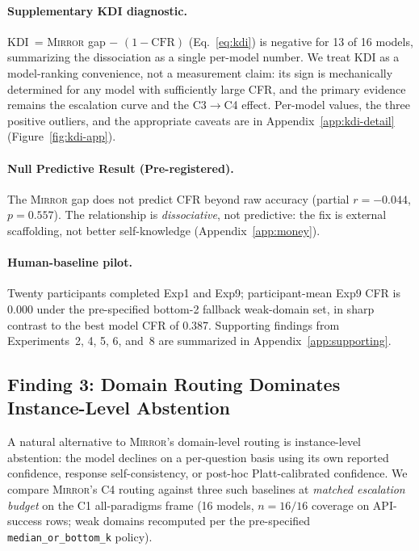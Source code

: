 \documentclass[10pt]{article}
\newcommand{\mirror}{\textsc{Mirror}}
\newcommand{\KDI}{KDI}
\newcommand{\CFR}{CFR}
\begin{document}
\paragraph{Supplementary \KDI{} diagnostic.}
\KDI{}~= \mirror{} gap $-$ $(1 - \text{CFR})$ (Eq.~\ref{eq:kdi}) is negative for 13 of 16 models, summarizing the dissociation as a single per-model number. We treat \KDI{} as a model-ranking convenience, not a measurement claim: its sign is mechanically determined for any model with sufficiently large \CFR{}, and the primary evidence remains the escalation curve and the C3$\to$C4 effect. Per-model values, the three positive outliers, and the appropriate caveats are in Appendix~\ref{app:kdi-detail} (Figure~\ref{fig:kdi-app}).

\paragraph{Null Predictive Result (Pre-registered).}
The \mirror{} gap does not predict \CFR{} beyond raw accuracy (partial $r = -0.044$, $p = 0.557$). The relationship is \textit{dissociative}, not predictive: the fix is external scaffolding, not better self-knowledge (Appendix~\ref{app:money}).

\paragraph{Human-baseline pilot.}
Twenty participants completed Exp1 and Exp9; participant-mean Exp9 CFR is 0.000 under the pre-specified bottom-2 fallback weak-domain set, in sharp contrast to the best model CFR of 0.387. Supporting findings from Experiments~2, 4, 5, 6, and~8 are summarized in Appendix~\ref{app:supporting}.

\subsection{Finding 3: Domain Routing Dominates Instance-Level Abstention}
\label{sec:instance-baselines}

A natural alternative to \mirror{}'s domain-level routing is instance-level abstention: the model declines on a per-question basis using its own reported confidence, response self-consistency, or post-hoc Platt-calibrated confidence. We compare \mirror{}'s C4 routing against three such baselines at \emph{matched escalation budget} on the C1 all-paradigms frame (16 models, $n\!=\!16/16$ coverage on API-success rows; weak domains recomputed per the pre-specified \texttt{median\_or\_bottom\_k} policy).
\end{document}
